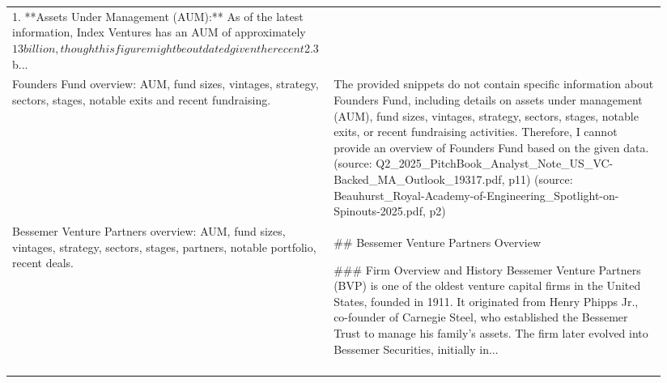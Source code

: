 \begin{longtable}{p{0.46\linewidth} p{0.48\linewidth}}
1. **Assets Under Management (AUM):** As of the latest information, Index Ventures has an AUM of approximately $13 billion, though this figure might be outdated given the recent $2.3 b... \\
\addlinespace
Founders Fund overview: AUM, fund sizes, vintages, strategy, sectors, stages, notable exits and recent fundraising. & The provided snippets do not contain specific information about Founders Fund, including details on assets under management (AUM), fund sizes, vintages, strategy, sectors, stages, notable exits, or recent fundraising activities. Therefore, I cannot provide an overview of Founders Fund based on the given data. (source: Q2_2025_PitchBook_Analyst_Note_US_VC-Backed_MA_Outlook_19317.pdf, p11) (source: Beauhurst_Royal-Academy-of-Engineering_Spotlight-on-Spinouts-2025.pdf, p2) \\
\addlinespace
Bessemer Venture Partners overview: AUM, fund sizes, vintages, strategy, sectors, stages, partners, notable portfolio, recent deals. & ## Bessemer Venture Partners Overview

### Firm Overview and History
Bessemer Venture Partners (BVP) is one of the oldest venture capital firms in the United States, founded in 1911. It originated from Henry Phipps Jr., co-founder of Carnegie Steel, who established the Bessemer Trust to manage his family's assets. The firm later evolved into Bessemer Securities, initially in... \\
\addlinespace
\bottomrule
\end{longtable}

